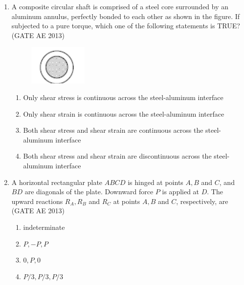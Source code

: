 \documentclass[journal,12pt,onecolumn]{IEEEtran}
\theoremstyle{remark}
\begin{document}
\begin{flushleft}
\begin{enumerate}
\item A composite circular shaft is comprised of a steel core surrounded by an aluminum annulus, perfectly bonded to each other as shown in the figure. If subjected to a pure torque, which one of the following statements is TRUE?
\hfill(GATE AE 2013)
\begin{figure}[H]
    \centering
    \includegraphics[width=0.35\columnwidth]{figs/39.png}
    \caption{}
    \label{fig:placeholder}
\end{figure}
\begin{enumerate}
  \item Only shear stress is continuous across the steel-aluminum interface
  \item Only shear strain is continuous across the steel-aluminum interface
  \item Both shear stress and shear strain are continuous across the steel-aluminum interface
  \item Both shear stress and shear strain are discontinuous across the steel-aluminum interface
\end{enumerate}

\item A horizontal rectangular plate $ABCD$ is hinged at points $A,B$ and $C$, and $BD$ are diagonals of the plate. Downward force $P$ is applied at $D$. The upward reactions $R_A,R_B$ and $R_C$ at points $A,B$ and $C$, respectively, are
\hfill(GATE AE 2013)

\begin{multicols}{2}
\begin{enumerate}
  \item indeterminate
  \item $P,-P,P$
  \item $0,P,0$
  \item $P/3,P/3,P/3$
\end{enumerate}
\end{multicols}


\end{enumerate}
\end{flushleft}
\end{document}
